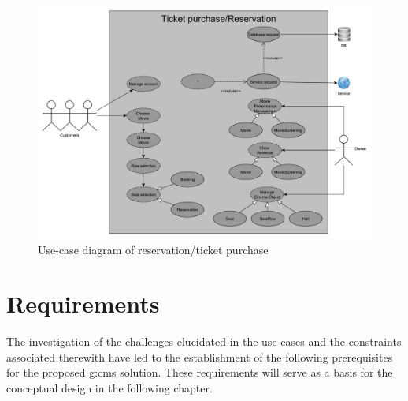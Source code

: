 \begin{figure}[H]
    \centering
    \includegraphics[width=\textwidth]{images/iis-use.case-new.pdf}
    \caption{Use-case diagram of reservation/ticket purchase}
    \label{fig:use-cases}
\end{figure}


\pagebreak

\section{Requirements}
\label{sec:requirements}

The investigation of the challenges elucidated in the use cases and the constraints associated therewith have led to the establishment of the following prerequisites for the proposed \gls{g:cms} solution. These requirements will serve as a basis for the conceptual design in the following chapter.


